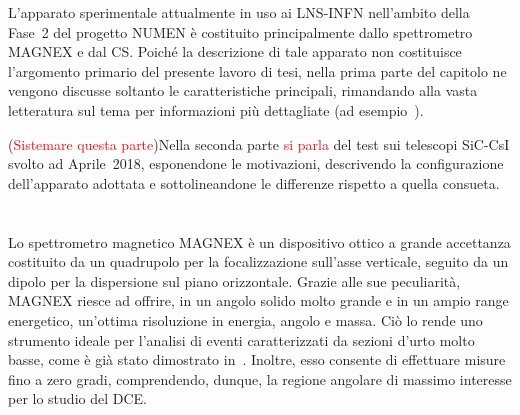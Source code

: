 

L'apparato sperimentale attualmente in uso ai LNS-INFN nell'ambito della Fase~2 del progetto NUMEN è costituito principalmente dallo spettrometro MAGNEX e dal CS.
Poiché la descrizione di tale apparato non costituisce l'argomento primario del presente lavoro di tesi, nella prima parte del capitolo ne vengono discusse soltanto le caratteristiche principali, rimandando alla vasta letteratura sul tema per informazioni più dettagliate (ad esempio~\cite{cavallaro:epja12, carbone:epja12, cappuzzello:epja16, cunsolo:epjst07}).

(\textcolor{red}{Sistemare questa parte})Nella seconda parte \textcolor{red}{si parla} del test sui telescopi SiC-CsI svolto ad Aprile~2018, esponendone le motivazioni, descrivendo la configurazione dell'apparato adottata e sottolineandone le differenze rispetto a quella consueta.


\section{}

Lo spettrometro magnetico MAGNEX è un dispositivo ottico a grande accettanza costituito da un quadrupolo per la focalizzazione sull'asse verticale, seguito da un dipolo per la dispersione sul piano orizzontale.
Grazie alle sue peculiarità,  MAGNEX riesce ad offrire, in un angolo solido molto grande e in un ampio range energetico, un'ottima risoluzione in energia, angolo e massa.
Ciò lo rende uno strumento ideale per l'analisi di eventi caratterizzati da sezioni d'urto molto basse, come è già stato dimostrato in~\cite{cappuzzello:epja16,pereira:plb12,oliveira:jpg13}.
Inoltre, esso consente di effettuare misure fino a zero gradi, comprendendo, dunque, la regione angolare di massimo interesse per lo studio del DCE.

